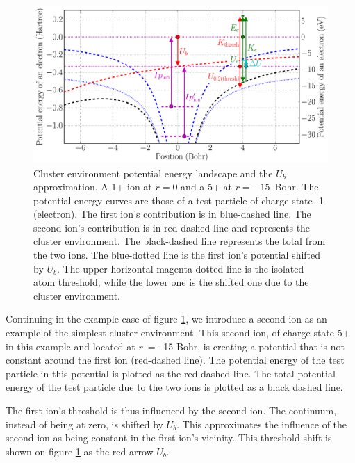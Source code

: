 \begin{figure}
    \begin{center}
    \includegraphics[width=\figurewidth]{figures/potential_landscape}
    \end{center}
    \caption{\label{fig:md:Vb}Cluster environment potential energy landscape
             and the $U_b$ approximation. A 1+ ion at $r=0$ and a 5+ at
             $r=-15$~Bohr. The potential energy curves are those of a test
             particle of charge state -1 (electron).
             The first ion's contribution is in blue-dashed line. The second ion's
             contribution is in red-dashed line and represents the cluster environment.
             The black-dashed line represents the total from the two ions.
             The blue-dotted line is the first ion's potential shifted by $U_b$.
             The upper horizontal magenta-dotted line is the isolated atom
             threshold, while the lower one is the shifted one due to the cluster
             environment.}
\end{figure}


Continuing in the example case of figure \ref{fig:md:Vb}, we introduce a
second ion as an example of the simplest cluster environment. This second ion, of
charge state 5+ in this example and located at $r$~=~-15 Bohr, is creating a
potential that is not constant around the first ion (red-dashed line). The potential energy of
the test particle in this potential is plotted as the red dashed line. The total
potential energy of the test particle due to the two ions is plotted as a black
dashed line.

The first ion's threshold is thus influenced by the second ion. The continuum,
instead of being at zero, is shifted by $U_b$. This approximates the
influence of the second ion as being constant in the first ion's vicinity. This
threshold shift is shown on figure \ref{fig:md:Vb} as the red arrow $U_b$.

